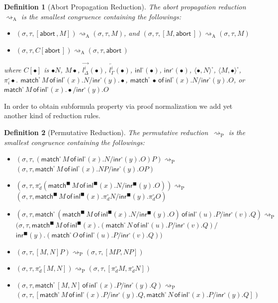 \documentclass[doctor]{iscs-thesis}
\newtheorem{definition}{Definition}
\newcommand{\reduce}{\rightsquigarrow}
\newcommand{\spair} [1]{\langle{#1}\rangle^{\square}}
\newcommand{\cotuple}[1]{[{#1}]}
\newcommand{\sinl}[1]{\mathsf{inl}^{\square}\left({#1}\right)}
\newcommand{\bsinl}[1]{\mathsf{inl}^{\blacksquare}\left({#1}\right)}
\newcommand{\sinr}[1]{\mathsf{inr}^{\square}\left({#1}\right)}
\newcommand{\bsinr}[1]{\mathsf{inr}^{\blacksquare}\left({#1}\right)}
\newcommand{\smat}[5]{\mathsf{match}^{\square}\,{#1}\,\mathsf{of}\, \sinl{#2}. {#3}/
\sinr{#4}. {#5}}
\newcommand{\bsmat}[5]{\mathsf{match}^{\blacksquare}\,{#1}\,\mathsf{of}\, \bsinl{#2}. {#3}/
\bsinr{#4}. {#5}}
\newcommand{\ltor}[4]{\overrightarrow{{#2}^{#1}_{#3}} \left({#4}\right)}
\newcommand{\rtol}[4]{\overleftarrow{{#2}^{#1}_{#3}} \left({#4}\right)}
\newcommand{\abort}{\mathsf{abort\,}}
\newcommand{\lstore}{{\sigma}}
\newcommand{\rstore}{{\tau}}
\newcommand{\conf}[3]{(\lstore{#1},\rstore{#2},{#3})}
\newcommand{\areduce}{\reduce_{\mathrm A}}
\newcommand{\preduce}{\reduce_{\mathrm P}}
\begin{document}
\begin{definition}[Abort Propagation Reduction]
 The abort propagation reduction $\areduce$ is the smallest
 congruence containing the
 followings:
\begin{itemize}
 \item  $\conf{}{}{\cotuple{\abort, M}}\areduce
 \conf{}{}{M}$, and
   $\conf{}{}{\cotuple{M,\abort}}\areduce
 \conf{}{}{M}$
 \item  $\conf{}{}{C[\abort]}\areduce
 \conf{}{}{\abort}$
\end{itemize}
 where $C[\bullet]$ is 
$\bullet N$, 
${M \bullet}$,
$\ltor i l \Delta \bullet$,
$\rtol i l \Gamma \bullet$,
$\sinl \bullet$,
$\sinr \bullet$,
$\spair {\bullet, N}$,
$\spair {M, \bullet}$,
$\pi^\square_i \bullet$.
$\smat M x N y \bullet$,
$\smat  \bullet x N y O$, or  \\
$\smat  M x \bullet y O$ 
\end{definition}
In order to obtain subformula property
 via proof normalization
we add yet another kind of reduction rules.
\begin{definition}[Permutative Reduction]
 The permutative reduction~$\preduce$ is the smallest congruence
 containing the followings:
\begin{itemize}
 \small
 \item $\conf{}{}{ \left(\smat  M x N y O\right) P }\preduce$ \\
       $\conf{}{}{ \smat M x {N P} y {O P} }$
 \item $\conf{}{}{ \pi^\square_d \left(\bsmat M x N y
       O\right)}\preduce$\\
       $\conf{}{}{ \bsmat M x
       {\pi^\square_d N} y {\pi^\square_d O} }$
 \item {
       $\conf{}{}{ \smat
                          {\left(\bsmat  M x N y O\right)}
                          u P v Q
                      }\preduce$ \\
       $(\lstore, \rstore, 
        \mathsf{match}^{\blacksquare}\,{M}\,\mathsf{of}\, \bsinl{x}. {
                          {\left(\smat N u P v Q\right)}
       } /$ \\ \phantom{mmmmmmmmmmm}$
       \bsinr{y}. {\left(\smat  O u P v Q\right)}
                      )
       $}
 \item $\conf{}{}{ \cotuple{M, N} P }\preduce
        \conf{}{}{ \cotuple{MP, NP} }$
 \item $\conf{}{}{ \pi^\square_d\cotuple{M,N} }\preduce
        \conf{}{}{ \cotuple{\pi^\square_d M, \pi^\square_d N} }$
 \item $\conf{}{}{ \smat {\cotuple{M,N}} x P y Q }\preduce$\\
       $\conf{}{}{ \cotuple{
                          \smat  M x P y Q,
                          \smat N x P y Q
                        } }$
\end{itemize}
\end{definition}
\end{document}
